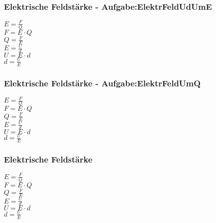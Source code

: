 \subsubsection{Elektrische Feldstärke - Aufgabe:ElektrFeldUdUmE} 
\begin{minipage}{0.45\textwidth} 
$ E = \frac{F}{Q} $\\ 
$ F = E\cdot Q $\\ 
$ Q = \frac{F}{E} $\\ 
$ E = \frac{U}{d} $\\ 
$ U = E\cdot d $\\ 
$ d = \frac{U}{E} $\\ 
\end{minipage} 
\begin{minipage}{0.45\textwidth} 
 
\end{minipage} 
\subsubsection{Elektrische Feldstärke - Aufgabe:ElektrFeldUmQ} 
\begin{minipage}{0.45\textwidth} 
$ E = \frac{F}{Q} $\\ 
$ F = E\cdot Q $\\ 
$ Q = \frac{F}{E} $\\ 
$ E = \frac{U}{d} $\\ 
$ U = E\cdot d $\\ 
$ d = \frac{U}{E} $\\ 
\end{minipage} 
\begin{minipage}{0.45\textwidth} 
 
\end{minipage} 
\subsubsection{Elektrische Feldstärke} 
\begin{minipage}{0.45\textwidth} 
$ E = \frac{F}{Q} $\\ 
$ F = E\cdot Q $\\ 
$ Q = \frac{F}{E} $\\ 
$ E = \frac{U}{d} $\\ 
$ U = E\cdot d $\\ 
$ d = \frac{U}{E} $\\ 
\end{minipage} 
\begin{minipage}{0.45\textwidth} 
 
\end{minipage} 
